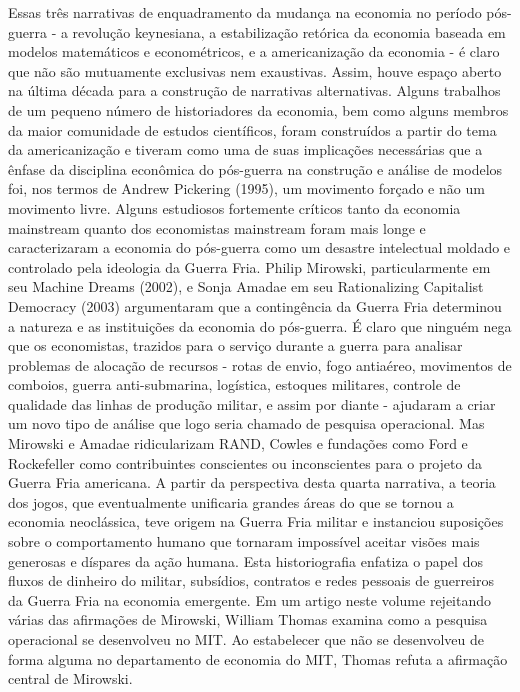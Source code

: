\documentclass[a4paper,12pt]{article}[abntex2]
\begin{document}
Essas três narrativas de enquadramento da mudança na economia no período pós-guerra - a revolução keynesiana, a estabilização retórica da economia baseada em modelos matemáticos e econométricos, e a americanização da economia - é claro que não são mutuamente exclusivas nem exaustivas. Assim, houve espaço aberto na última década para a construção de narrativas alternativas. Alguns trabalhos de um pequeno número de historiadores da economia, bem como alguns membros da maior comunidade de estudos científicos, foram construídos a partir do tema da americanização e tiveram como uma de suas implicações necessárias que a ênfase da disciplina econômica do pós-guerra na construção e análise de modelos foi, nos termos de Andrew Pickering (1995), um movimento forçado e não um movimento livre. Alguns estudiosos fortemente críticos tanto da economia mainstream quanto dos economistas mainstream foram mais longe e caracterizaram a economia do pós-guerra como um desastre intelectual moldado e controlado pela ideologia da Guerra Fria. Philip Mirowski, particularmente em seu Machine Dreams (2002), e Sonja Amadae em seu Rationalizing Capitalist Democracy (2003) argumentaram que a contingência da Guerra Fria determinou a natureza e as instituições da economia do pós-guerra. É claro que ninguém nega que os economistas, trazidos para o serviço durante a guerra para analisar problemas de alocação de recursos - rotas de envio, fogo antiaéreo, movimentos de comboios, guerra anti-submarina, logística, estoques militares, controle de qualidade das linhas de produção militar, e assim por diante - ajudaram a criar um novo tipo de análise que logo seria chamado de pesquisa operacional. Mas Mirowski e Amadae ridicularizam RAND, Cowles e fundações como Ford e Rockefeller como contribuintes conscientes ou inconscientes para o projeto da Guerra Fria americana. A partir da perspectiva desta quarta narrativa, a teoria dos jogos, que eventualmente unificaria grandes áreas do que se tornou a economia neoclássica, teve origem na Guerra Fria militar e instanciou suposições sobre o comportamento humano que tornaram impossível aceitar visões mais generosas e díspares da ação humana. Esta historiografia enfatiza o papel dos fluxos de dinheiro do militar, subsídios, contratos e redes pessoais de guerreiros da Guerra Fria na economia emergente. Em um artigo neste volume rejeitando várias das afirmações de Mirowski, William Thomas examina como a pesquisa operacional se desenvolveu no MIT. Ao estabelecer que não se desenvolveu de forma alguma no departamento de economia do MIT, Thomas refuta a afirmação central de Mirowski.
\end{document}
